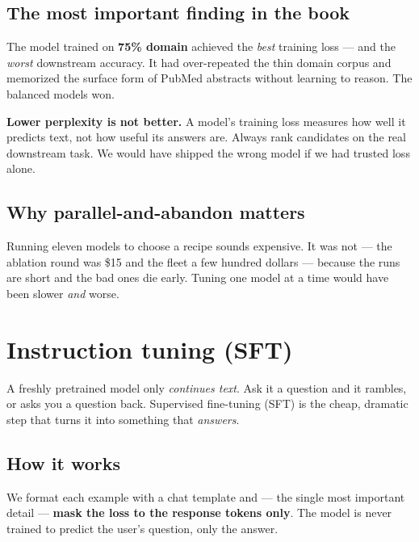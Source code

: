 \section{The most important finding in the book}

\noindent The model trained on \textbf{75\% domain} achieved the \emph{best} training loss --- and the
\emph{worst} downstream accuracy. It had over-repeated the thin domain corpus and memorized the surface form
of PubMed abstracts without learning to reason. The balanced models won.

\begin{lesson}
\textbf{Lower perplexity is not better.} A model's training loss measures how well it predicts text, not how
useful its answers are. Always rank candidates on the real downstream task. We would have shipped the wrong
model if we had trusted loss alone.
\end{lesson}

\section{Why parallel-and-abandon matters}

\noindent Running eleven models to choose a recipe sounds expensive. It was not --- the ablation round was
\$15 and the fleet a few hundred dollars --- because the runs are short and the bad ones die early. Tuning one
model at a time would have been slower \emph{and} worse.

\chapter{Instruction tuning (SFT)}

A freshly pretrained model only \emph{continues text}. Ask it a question and it rambles, or asks you a
question back. Supervised fine-tuning (SFT) is the cheap, dramatic step that turns it into something that
\emph{answers}.

\section{How it works}
We format each example with a chat template and --- the single most important detail --- \textbf{mask the loss
to the response tokens only}. The model is never trained to predict the user's question, only the answer.


